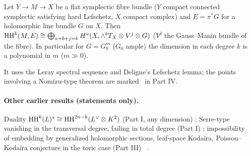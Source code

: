 \begin{thm}\label{thm:L}
Let $Y\to M\to X$ be a flat symplectic fibre bundle ($Y$ compact connected symplectic satisfying hard Lefschetz, $X$ compact complex) and $E=\pi^*G$ for a holomorphic line bundle $G$ on $X$. Then $\mathrm{HH}^k(M,E)\cong\bigoplus_{a+b+j=k}H^a(X,\wedge^bT_X\otimes V^j\otimes G)$ ($V^j$ the Gauss--Manin bundle of the fibre). In particular for $G=G_0^m$ ($G_0$ ample) the dimension in each degree $k$ is a polynomial in $m$ ($m\gg0$).
\end{thm}
It uses the Leray spectral sequence and Deligne's Lefschetz lemma; the points involving a Nomizu-type theorem are marked \tQ\ in Part IV.

\paragraph{Other earlier results (statements only).} Duality $\mathrm{HH}^k(L)^*\cong\mathrm{HH}^{2n-k}(L^\vee\otimes K^2)$ (Part I, any dimension) \tP; Serre-type vanishing in the transversal degree, failing in total degree (Part I) \tP; impossibility of embedding by generalized holomorphic sections, leaf-space Kodaira, Poisson--Kodaira conjecture in the toric case (Part III) \tP\ \tK.

